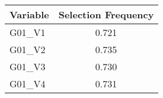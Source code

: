 

\begin{tabular}[t]{lc}
\toprule
Variable & Selection Frequency\\
\midrule
G01\_V1 & 0.721\\
G01\_V2 & 0.735\\
G01\_V3 & 0.730\\
G01\_V4 & 0.731\\
\bottomrule
\end{tabular}

